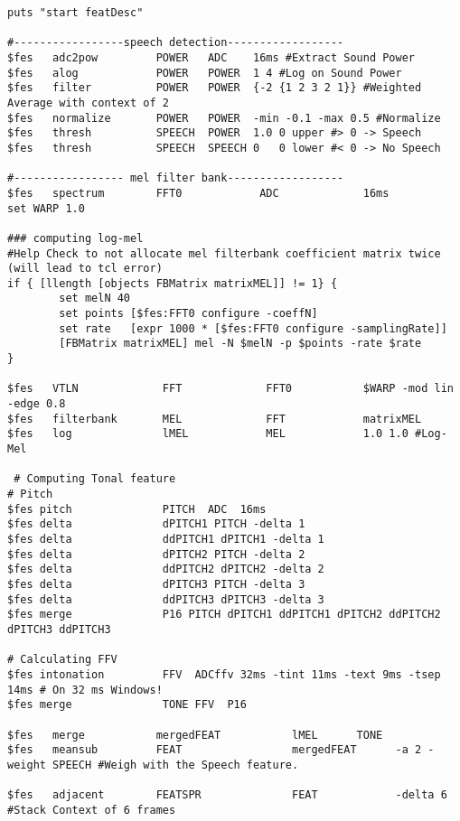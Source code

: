 \begin{lstlisting}[label=lst:features,caption=The feature description as used by our pre-DBNF-preprocessing]
puts "start featDesc"

#-----------------speech detection------------------
$fes   adc2pow         POWER   ADC    16ms #Extract Sound Power
$fes   alog            POWER   POWER  1 4 #Log on Sound Power
$fes   filter          POWER   POWER  {-2 {1 2 3 2 1}} #Weighted Average with context of 2
$fes   normalize       POWER   POWER  -min -0.1 -max 0.5 #Normalize
$fes   thresh          SPEECH  POWER  1.0 0 upper #> 0 -> Speech
$fes   thresh          SPEECH  SPEECH 0   0 lower #< 0 -> No Speech

#----------------- mel filter bank------------------
$fes   spectrum        FFT0            ADC             16ms
set WARP 1.0
        
### computing log-mel
#Help Check to not allocate mel filterbank coefficient matrix twice (will lead to tcl error)
if { [llength [objects FBMatrix matrixMEL]] != 1} {
        set melN 40
        set points [$fes:FFT0 configure -coeffN]
        set rate   [expr 1000 * [$fes:FFT0 configure -samplingRate]]
        [FBMatrix matrixMEL] mel -N $melN -p $points -rate $rate
}

$fes   VTLN             FFT             FFT0           $WARP -mod lin -edge 0.8
$fes   filterbank       MEL             FFT            matrixMEL
$fes   log              lMEL            MEL            1.0 1.0 #Log-Mel

 # Computing Tonal feature
# Pitch
$fes pitch              PITCH  ADC  16ms
$fes delta              dPITCH1 PITCH -delta 1
$fes delta              ddPITCH1 dPITCH1 -delta 1
$fes delta              dPITCH2 PITCH -delta 2
$fes delta              ddPITCH2 dPITCH2 -delta 2
$fes delta              dPITCH3 PITCH -delta 3
$fes delta              ddPITCH3 dPITCH3 -delta 3
$fes merge              P16 PITCH dPITCH1 ddPITCH1 dPITCH2 ddPITCH2 dPITCH3 ddPITCH3

# Calculating FFV
$fes intonation         FFV  ADCffv 32ms -tint 11ms -text 9ms -tsep 14ms # On 32 ms Windows!
$fes merge              TONE FFV  P16

$fes   merge           mergedFEAT           lMEL      TONE
$fes   meansub         FEAT                 mergedFEAT      -a 2 -weight SPEECH #Weigh with the Speech feature.

$fes   adjacent        FEATSPR              FEAT            -delta 6 #Stack Context of 6 frames
\end{lstlisting}

